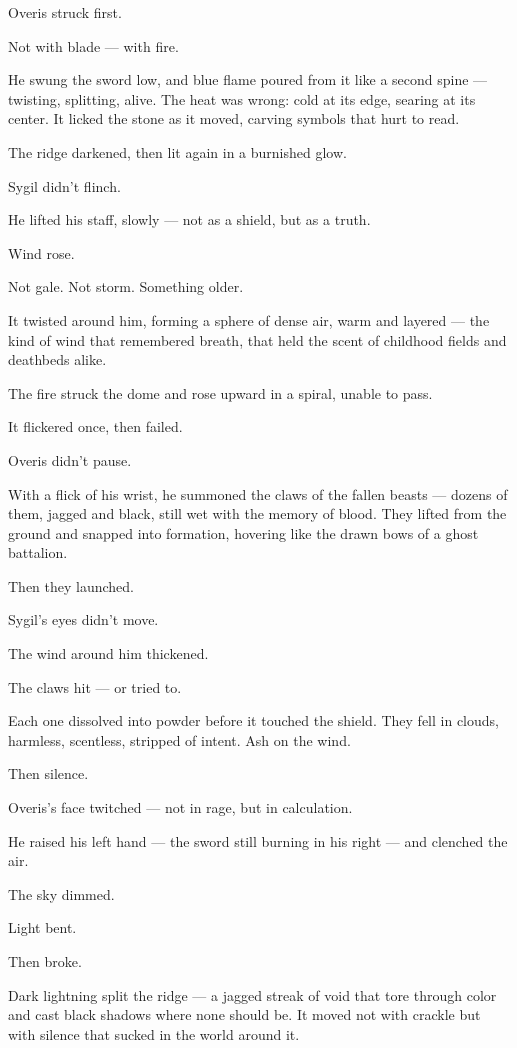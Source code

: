 \documentclass[9pt]{article}
\begin{document}
Overis struck first.

Not with blade — with fire.

He swung the sword low, and blue flame poured from it like a second spine — twisting, splitting, alive. The heat was wrong: cold at its edge, searing at its center. It licked the stone as it moved, carving symbols that hurt to read.

The ridge darkened, then lit again in a burnished glow.

Sygil didn’t flinch.

He lifted his staff, slowly — not as a shield, but as a truth.

Wind rose.

Not gale. Not storm. Something older.

It twisted around him, forming a sphere of dense air, warm and layered — the kind of wind that remembered breath, that held the scent of childhood fields and deathbeds alike.

The fire struck the dome and rose upward in a spiral, unable to pass.

It flickered once, then failed.

\bigskip

Overis didn’t pause.

With a flick of his wrist, he summoned the claws of the fallen beasts — dozens of them, jagged and black, still wet with the memory of blood. They lifted from the ground and snapped into formation, hovering like the drawn bows of a ghost battalion.

Then they launched.

Sygil’s eyes didn’t move.

The wind around him thickened.

The claws hit — or tried to.

Each one dissolved into powder before it touched the shield. They fell in clouds, harmless, scentless, stripped of intent. Ash on the wind.

Then silence.

\bigskip

Overis’s face twitched — not in rage, but in calculation.

He raised his left hand — the sword still burning in his right — and clenched the air.

The sky dimmed.

Light bent.

Then broke.

Dark lightning split the ridge — a jagged streak of void that tore through color and cast black shadows where none should be. It moved not with crackle but with silence that sucked in the world around it.
\end{document}
